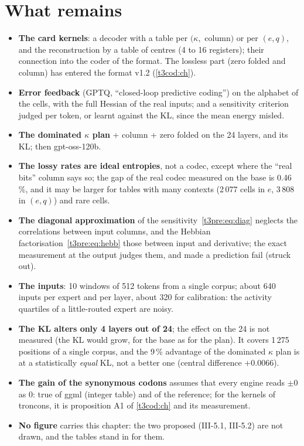 \section{What remains}\label{t3pre:sec:reste}

\begin{itemize}
\item \textbf{The card kernels}: a decoder with a table per $(\kappa,$ column$)$ or per $(e, q)$, and the reconstruction by a table of centres (4 to 16 registers); their connection into the coder of the format. The lossless part (zero folded and column) has entered the format v1.2 (\cref{t3cod:ch}).
\item \textbf{Error feedback} (GPTQ, ``closed-loop predictive coding'') on the alphabet of the cells, with the full Hessian of the real inputs; and a sensitivity criterion judged per token, or learnt against the KL, since the mean energy misled.
\item \textbf{The dominated $\kappa$ plan} + column + zero folded on the 24 layers, and its KL; then gpt-oss-120b.
\end{itemize}

\begin{faux}
\begin{itemize}
\item \textbf{The lossy rates are ideal entropies}, not a codec, except where the ``real bits'' column says so; the gap of the real codec measured on the base is 0.46\,\%, and it may be larger for tables with many contexts (2\,077 cells in $e$, 3\,808 in $(e, q)$) and rare cells.
\item \textbf{The diagonal approximation} of the sensitivity~\eqref{t3pre:eq:diag} neglects the correlations between input columns, and the Hebbian factorisation~\eqref{t3pre:eq:hebb} those between input and derivative; the exact measurement at the output judges them, and made a prediction fail (struck out).
\item \textbf{The inputs}: 10 windows of 512 tokens from a single corpus; about 640 inputs per expert and per layer, about 320 for calibration: the activity quartiles of a little-routed expert are noisy.
\item \textbf{The KL alters only 4 layers out of 24}; the effect on the 24 is not measured (the KL would grow, for the base as for the plan). It covers 1\,275 positions of a single corpus, and the 9\,\% advantage of the dominated $\kappa$ plan is at a statistically \emph{equal} KL, not a better one (central difference $+0.0066$).
\item \textbf{The gain of the synonymous codons} assumes that every engine reads $\pm0$ as 0: true of ggml (integer table) and of the reference; for the kernels of troncons, it is proposition A1 of \cref{t3cod:ch} and its measurement.
\item \textbf{No figure} carries this chapter: the two proposed (III-5.1, III-5.2) are not drawn, and the tables stand in for them.
\end{itemize}
\end{faux}
